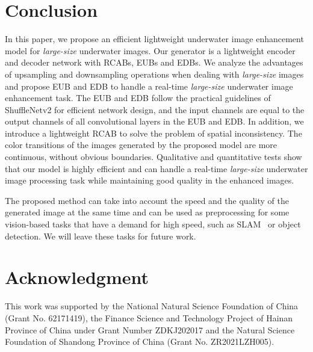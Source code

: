 \documentclass[utf8]{FrontiersinHarvard} %
\begin{document}
\section{Conclusion}
In this paper, we propose an efficient lightweight underwater image enhancement model for \textit{large-size} underwater images. Our generator is a lightweight encoder and decoder network with RCABs, EUBs and EDBs. We analyze the advantages of upsampling and downsampling operations when dealing with \textit{large-size} images and propose EUB and EDB to handle a real-time \textit{large-size} underwater image enhancement task. The EUB and EDB follow the practical guidelines of ShuffleNetv2 for efficient network design, and the input channels are equal to the output channels of all convolutional layers in the EUB and EDB. In addition, we introduce a lightweight RCAB to solve the problem of spatial inconsistency. The color transitions of the images generated by the proposed model are more continuous, without obvious boundaries. Qualitative and quantitative tests show that our model is highly efficient and can handle a real-time \textit{large-size} underwater image processing task while maintaining good quality in the enhanced images.

The proposed method can take into account the speed and the quality of the generated image at the same time and can be used as preprocessing for some vision-based tasks that have a demand for high speed, such as SLAM~\citep{yang2021asynchronous} or object detection. We will leave these tasks for future work.

\section*{Acknowledgment}
This work was supported by the National Natural Science Foundation of China (Grant No. 62171419), the Finance Science and Technology Project of Hainan Province of China under Grant Number ZDKJ202017 and the Natural Science Foundation of Shandong Province of China (Grant No. ZR2021LZH005).


\end{document}

